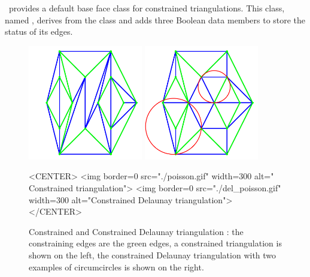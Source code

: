 \cgal\ provides a default base face class
for constrained triangulations. This class, named
,
derives from the class
and adds three Boolean data members to store the status of its edges. 


\begin{figure}
\begin{ccTexOnly}
\begin{center}
\includegraphics[width=5cm]{Triangulation_2/poisson}
\includegraphics[width=5cm]{Triangulation_2/del_poisson}
\end{center}
\end{ccTexOnly}

\begin{ccHtmlOnly}
<CENTER>
<img border=0 src="./poisson.gif" width=300 alt=" Constrained triangulation">
<img border=0 src="./del_poisson.gif" width=300 alt="Constrained Delaunay triangulation">
</CENTER>
\end{ccHtmlOnly}

\caption{Constrained and Constrained Delaunay triangulation : 
 the constraining edges are the green edges,  a constrained
triangulation is shown on the left, the constrained Delaunay
triangulation with two examples of circumcircles is shown on the right.}
\label{2D_Triangulation_Fig_constrained}
\end{figure}



